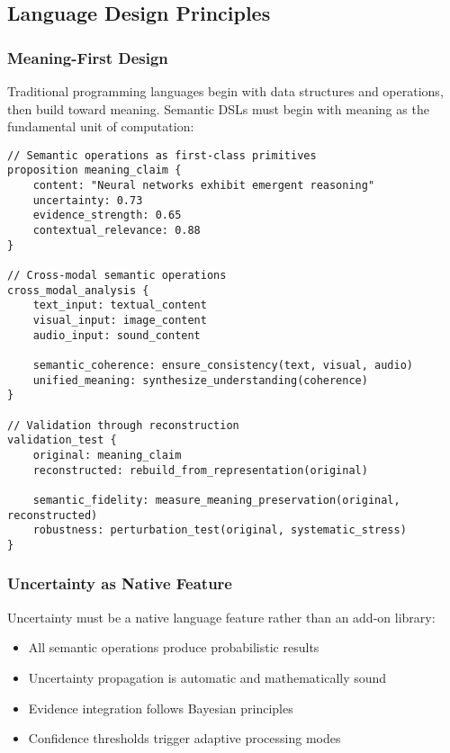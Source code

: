 \documentclass[12pt,a4paper,twoside]{article}
\begin{document}
\subsection{Language Design Principles}

\subsubsection{Meaning-First Design}

Traditional programming languages begin with data structures and operations, then build toward meaning. Semantic DSLs must begin with meaning as the fundamental unit of computation:

\begin{lstlisting}[caption=Theoretical Semantic Language Syntax]
// Semantic operations as first-class primitives
proposition meaning_claim {
    content: "Neural networks exhibit emergent reasoning"
    uncertainty: 0.73
    evidence_strength: 0.65
    contextual_relevance: 0.88
}

// Cross-modal semantic operations
cross_modal_analysis {
    text_input: textual_content
    visual_input: image_content
    audio_input: sound_content

    semantic_coherence: ensure_consistency(text, visual, audio)
    unified_meaning: synthesize_understanding(coherence)
}

// Validation through reconstruction
validation_test {
    original: meaning_claim
    reconstructed: rebuild_from_representation(original)

    semantic_fidelity: measure_meaning_preservation(original, reconstructed)
    robustness: perturbation_test(original, systematic_stress)
}
\end{lstlisting}

\subsubsection{Uncertainty as Native Feature}

Uncertainty must be a native language feature rather than an add-on library:

\begin{itemize}
\item All semantic operations produce probabilistic results
\item Uncertainty propagation is automatic and mathematically sound
\item Evidence integration follows Bayesian principles
\item Confidence thresholds trigger adaptive processing modes
\end{itemize}
\end{document}
